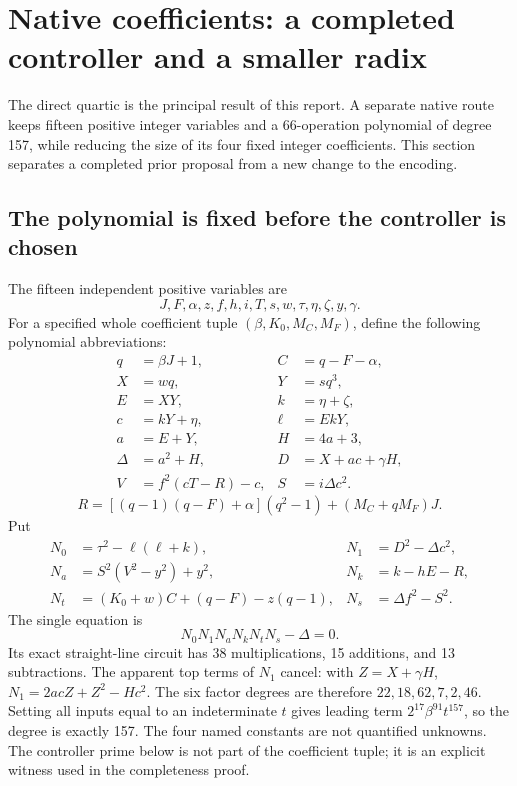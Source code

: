 \section{Native coefficients: a completed controller and a smaller radix}\label{sec:native}

The direct quartic is the principal result of this report. A separate
native route keeps fifteen positive integer variables and a 66-operation
polynomial of degree 157, while reducing the size of its four fixed
integer coefficients. This section separates a completed prior proposal
from a new change to the encoding.

\subsection{The polynomial is fixed before the controller is chosen}

The fifteen independent positive variables are
\[
 J,F,\alpha,z,f,h,i,T,s,w,\tau,\eta,\zeta,y,\gamma.
\]
For a specified whole coefficient tuple $(\beta,K_0,M_C,M_F)$, define
the following polynomial abbreviations:
\[
\begin{aligned}
 q&=\beta J+1,& C&=q-F-\alpha,\\
 X&=wq,& Y&=sq^3,\\
 E&=XY,& k&=\eta+\zeta,\\
 c&=kY+\eta,& \ell&=EkY,\\
 a&=E+Y,& H&=4a+3,\\
 \Delta&=a^2+H,& D&=X+ac+\gamma H,\\
 V&=f^2(cT-R)-c,& S&=i\Delta c^2.
\end{aligned}
\]
\[
 R=[(q-1)(q-F)+\alpha](q^2-1)+(M_C+qM_F)J.
\]
Put
\begin{align*}
 N_0&=\tau^2-\ell(\ell+k),&N_1&=D^2-\Delta c^2,\\
 N_a&=S^2(V^2-y^2)+y^2,&N_k&=k-hE-R,\\
 N_t&=(K_0+w)C+(q-F)-z(q-1),&N_s&=\Delta f^2-S^2.
\end{align*}
The single equation is
\begin{equation}\label{eq:p66}
 \boxed{N_0N_1N_aN_kN_tN_s-\Delta=0.}
\end{equation}
Its exact straight-line circuit has 38 multiplications, 15 additions,
and 13 subtractions. The apparent top terms of $N_1$ cancel: with $Z=X+\gamma H$,
$N_1=2acZ+Z^2-Hc^2$. The six factor degrees are therefore
$22,18,62,7,2,46$. Setting all inputs equal to an indeterminate $t$
gives leading term $2^{17}\beta^{91}t^{157}$, so the degree is exactly
157. The four named constants are not quantified unknowns. The controller prime below is not part of the coefficient
tuple; it is an explicit witness used in the completeness proof.

